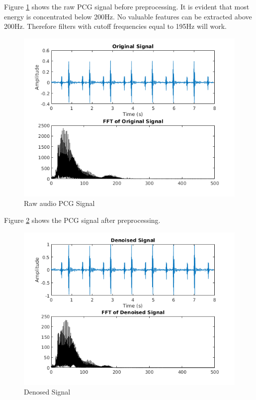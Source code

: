 \documentclass[10pt,twocolumn]{witseiepaper}
\begin{document}
Figure \ref{fig:6} shows the raw PCG signal before preprocessing. It is evident that most energy is concentrated below 200Hz. No valuable features can be extracted above 200Hz. Therefore filters with cutoff frequencies equal to 195Hz will work.
\begin{figure}[h!]
    \centering
    \includegraphics[scale = 0.6]{1.png}
    \caption{Raw audio PCG Signal}
    \label{fig:6}
\end{figure}{}

Figure \ref{fig:7} shows the PCG signal after preprocessing.
\begin{figure}[h!]
    \centering
    \includegraphics[scale = 0.6]{2.png}
    \caption{Denosed Signal}
    \label{fig:7}
\end{figure}{}
\end{document}
